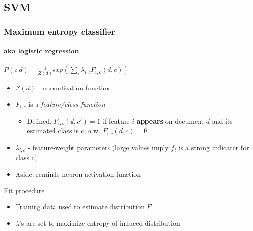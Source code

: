 \documentclass{beamer}
\begin{document}
\subsection{SVM}
\begin{frame}
	\frametitle{Maximum entropy classifier}
	\framesubtitle{aka logistic regression}
	\begin{Definition}
		$P(c|d) = \frac{1}{Z(d)} exp(\sum_{i}\lambda_{i,c}F_{i,c}(d,c))$
	\end{Definition}
	\begin{itemize}
		\pause
		\item $Z(d)$ - normalization function
		\pause
		\item $F_{i,c}$ is a \emph{feature/class function}\
		\pause
		\begin{itemize}
			\item Defined: $F_{i,c}(d,c') = 1$ if feature $i$ \textbf{appears} on document $d$ and its estimated class is c, o.w. $F_{i,c}(d,c) = 0$
		\end{itemize}
		\pause
		\item $\lambda_{i,c}$ - feature-weight parameters (large values imply $f_i$ is a strong indicator for class c)
		\pause
		\item Aside: reminds neuron  activation function
	\end{itemize}
	
	\pause
	\underline{Fit procedure}
	\begin{itemize}
		\item Training data used to estimate distribution $F$
		\item $\lambda$'s are set to maximize entropy of induced distribution
	\end{itemize}
			
\end{frame}
\end{document}
